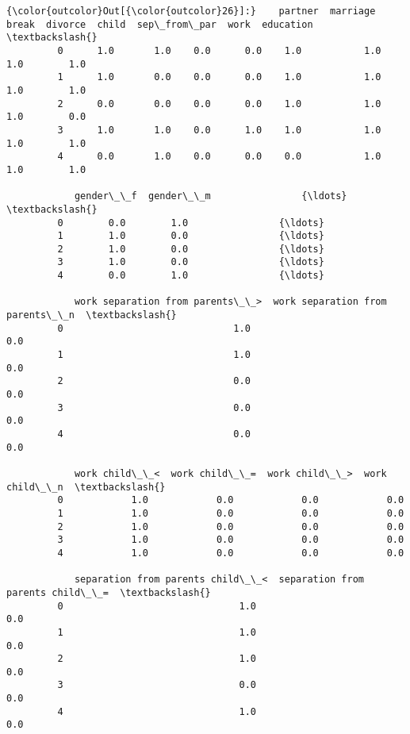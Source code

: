\documentclass[11pt]{article}
\begin{document}
\begin{Verbatim}[commandchars=\\\{\}]
{\color{outcolor}Out[{\color{outcolor}26}]:}    partner  marriage  break  divorce  child  sep\_from\_par  work  education  \textbackslash{}
         0      1.0       1.0    0.0      0.0    1.0           1.0   1.0        1.0   
         1      1.0       0.0    0.0      0.0    1.0           1.0   1.0        1.0   
         2      0.0       0.0    0.0      0.0    1.0           1.0   1.0        0.0   
         3      1.0       1.0    0.0      1.0    1.0           1.0   1.0        1.0   
         4      0.0       1.0    0.0      0.0    0.0           1.0   1.0        1.0   
         
            gender\_\_f  gender\_\_m                {\ldots}                 \textbackslash{}
         0        0.0        1.0                {\ldots}                  
         1        1.0        0.0                {\ldots}                  
         2        1.0        0.0                {\ldots}                  
         3        1.0        0.0                {\ldots}                  
         4        0.0        1.0                {\ldots}                  
         
            work separation from parents\_\_>  work separation from parents\_\_n  \textbackslash{}
         0                              1.0                              0.0   
         1                              1.0                              0.0   
         2                              0.0                              0.0   
         3                              0.0                              0.0   
         4                              0.0                              0.0   
         
            work child\_\_<  work child\_\_=  work child\_\_>  work child\_\_n  \textbackslash{}
         0            1.0            0.0            0.0            0.0   
         1            1.0            0.0            0.0            0.0   
         2            1.0            0.0            0.0            0.0   
         3            1.0            0.0            0.0            0.0   
         4            1.0            0.0            0.0            0.0   
         
            separation from parents child\_\_<  separation from parents child\_\_=  \textbackslash{}
         0                               1.0                               0.0   
         1                               1.0                               0.0   
         2                               1.0                               0.0   
         3                               0.0                               0.0   
         4                               1.0                               0.0   
         

\end{Verbatim}
\end{document}
